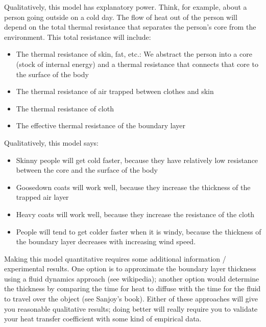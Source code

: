 Qualitatively, this model has explanatory power.  Think, for example, about a person going outside on a cold day.  The flow of heat out of the person will depend on the total thermal resistance that separates the person's core from the environment.  This total resistance will include:
\begin{itemize}
\item The thermal resistance of skin, fat, etc.: We abstract the person into a core (stock of internal energy) and a thermal resistance that connects that core to the surface of the body
\item The thermal resistance of air trapped between clothes and skin
\item The thermal resistance of cloth
\item The effective thermal resistance of the boundary layer
\end{itemize}
Qualitatively, this model says:
\begin{itemize}
\item Skinny people will get cold faster, because they have relatively low resistance between the core and the surface of the body
\item Goosedown coats will work well, because they increase the thickness of the trapped air layer
\item Heavy coats will work well, because they increase the resistance of the cloth
\item People will tend to get colder faster when it is windy, because the thickness of the boundary layer decreases with increasing wind speed.
\end{itemize}
Making this model quantitative requires some additional information / experimental results.  One option is to approximate the boundary layer thickness using a fluid dynamics approach (see wikipedia); another option would determine the thickness by comparing the time for heat to diffuse with the time for the fluid to travel over the object (see Sanjoy's book).  Either of these approaches will give you reasonable qualitative results; doing better will really require you to validate your heat transfer coefficient with some kind of empirical data.

